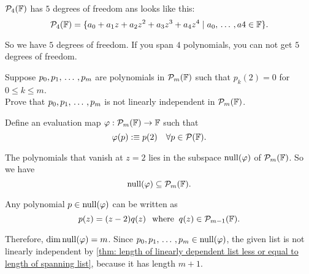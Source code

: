 \setcounter{xrcscount}{15}
\begin{xrcs}
  $\mathcal{P}_4(\mathbb{F})$ has $5$ degrees of freedom ans looks like this:
  \[
    \mathcal{P}_4(\mathbb{F}) = \{a_0 + a_1 z + a_2z^2 + a_3 z^3 + a_4 z^4 \mid a_0, {\, \ldots \,\,}, a4 \in \mathbb{F} \}.
  \]

  So we have $5$ degrees of freedom. If you span $4$ polynomials, you can not get $5$ degrees of freedom.
\end{xrcs}

\setcounter{xrcscount}{19}
\begin{xrcs}
  Suppose $p_0, p_1, {\, \ldots \,\,}, p_m$ are polynomials in $\mathcal{P}_m(\mathbb{F})$ such that $p_k(2) = 0$ for $0\leq k \leq m$. \\
  Prove that $p_0, p_1, {\, \ldots \,\,}, p_m$ is not linearly independent in $\mathcal{P}_m(\mathbb{F})$.

  \begin{xprf}
    Define an evaluation map $\varphi : \mathcal{P}_m(\mathbb{F}) \to \mathbb{F}$ such that
    \[
    \varphi(p) :\equiv p(2) \quad \forall p \in \mathcal{P}(\mathbb{F}).
    \]

    The polynomials that vanish at $z=2$ lies in the subspace $\operatorname{null}(\varphi)$ of $\mathcal{P}_m(\mathbb{F})$. So  we have
    \[
    \operatorname{null}(\varphi) \subseteq \mathcal{P}_m(\mathbb{F}).
    \]

    Any polynomial $p \in \operatorname{null}(\varphi)$ can be written as
    \[
    p(z) = (z-2) q(z) \;\;\, \text{where}\;\; q(z) \in \mathcal{P}_{m-1} (\mathbb{F}).
    \]

    Therefore, $\operatorname{dim} \operatorname{null}(\varphi) = m$. Since $p_0, p_1, {\, \ldots \,\,}, p_m \in \operatorname{null}(\varphi)$, the given list is not linearly independent by \ref{thm: length of linearly dependent list less or equal to length of spanning list}, because it has length $m+1$.
  \end{xprf}

\end{xrcs}

